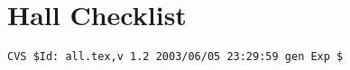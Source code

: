\chapter{Hall Checklist}




%
%
{\small
\begin{verbatim}CVS $Id: all.tex,v 1.2 2003/06/05 23:29:59 gen Exp $\end{verbatim}
}

